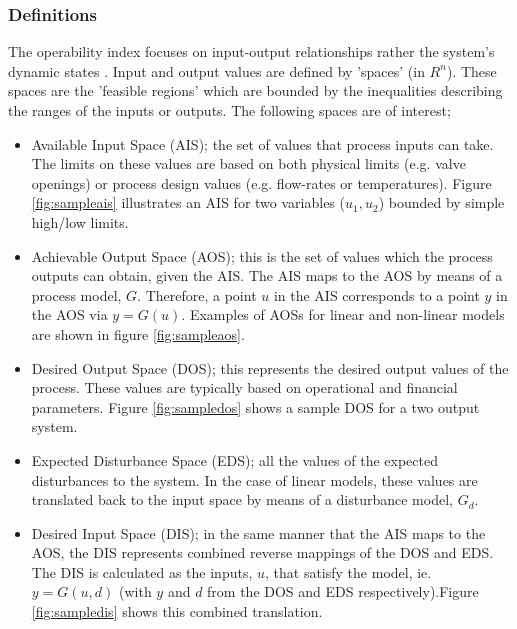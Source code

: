 \subsubsection{Definitions}
The operability index focuses on input-output relationships rather the system's
dynamic states \citep{vinsonphd}. Input and output values are defined by
'spaces' (in $R^n$). These spaces are the 'feasible regions' which are 
bounded by the inequalities describing the ranges of the inputs or outputs. The
following spaces are of interest;
\begin{itemize}
  \item Available Input Space (AIS); the set of values that process inputs can
    take. The limits on these values are based on both physical limits (e.g.
    valve openings) or process design values (e.g. flow-rates or temperatures).
    Figure \ref{fig:sampleais} illustrates an AIS for two variables ($u_1, u_2$)
    bounded by simple high/low limits.
  \item Achievable Output Space (AOS); this is the set of values which the 
    process outputs can obtain, given the AIS. The AIS maps to the AOS by means
    of a process model, $G$. Therefore, a point $u$ in the AIS corresponds to
    a point $y$ in the AOS via $y=G(u)$. Examples of AOSs for linear and
    non-linear models are shown in figure \ref{fig:sampleaos}.
  \item Desired Output Space (DOS); this represents the desired output values of
    the process. These values are typically based on operational and financial
    parameters. Figure \ref{fig:sampledos} shows a sample DOS for a two output
    system.
  \item Expected Disturbance Space (EDS); all the values of the expected 
    disturbances to the system. In the case of linear models, these values are 
    translated back to the input space by means of a disturbance model, $G_d$.
  \item Desired Input Space (DIS); in the same manner that the AIS maps to the
    AOS, the DIS represents combined reverse mappings of the DOS and EDS. The
    DIS is calculated as the inputs, $u$, that satisfy the model, ie.
    $y=G(u,d)$ (with $y$ and $d$ from the DOS and EDS respectively).Figure 
    \ref{fig:sampledis} shows this combined translation.
\end{itemize}

